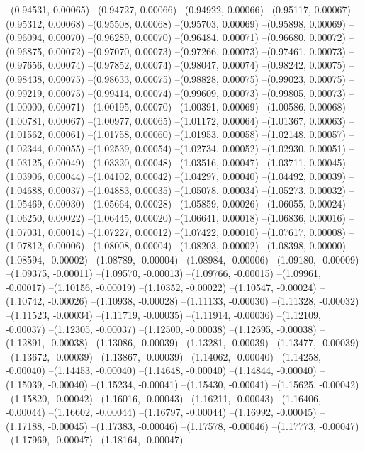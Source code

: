 --(0.94531, 0.00065)
--(0.94727, 0.00066)
--(0.94922, 0.00066)
--(0.95117, 0.00067)
--(0.95312, 0.00068)
--(0.95508, 0.00068)
--(0.95703, 0.00069)
--(0.95898, 0.00069)
--(0.96094, 0.00070)
--(0.96289, 0.00070)
--(0.96484, 0.00071)
--(0.96680, 0.00072)
--(0.96875, 0.00072)
--(0.97070, 0.00073)
--(0.97266, 0.00073)
--(0.97461, 0.00073)
--(0.97656, 0.00074)
--(0.97852, 0.00074)
--(0.98047, 0.00074)
--(0.98242, 0.00075)
--(0.98438, 0.00075)
--(0.98633, 0.00075)
--(0.98828, 0.00075)
--(0.99023, 0.00075)
--(0.99219, 0.00075)
--(0.99414, 0.00074)
--(0.99609, 0.00073)
--(0.99805, 0.00073)
--(1.00000, 0.00071)
--(1.00195, 0.00070)
--(1.00391, 0.00069)
--(1.00586, 0.00068)
--(1.00781, 0.00067)
--(1.00977, 0.00065)
--(1.01172, 0.00064)
--(1.01367, 0.00063)
--(1.01562, 0.00061)
--(1.01758, 0.00060)
--(1.01953, 0.00058)
--(1.02148, 0.00057)
--(1.02344, 0.00055)
--(1.02539, 0.00054)
--(1.02734, 0.00052)
--(1.02930, 0.00051)
--(1.03125, 0.00049)
--(1.03320, 0.00048)
--(1.03516, 0.00047)
--(1.03711, 0.00045)
--(1.03906, 0.00044)
--(1.04102, 0.00042)
--(1.04297, 0.00040)
--(1.04492, 0.00039)
--(1.04688, 0.00037)
--(1.04883, 0.00035)
--(1.05078, 0.00034)
--(1.05273, 0.00032)
--(1.05469, 0.00030)
--(1.05664, 0.00028)
--(1.05859, 0.00026)
--(1.06055, 0.00024)
--(1.06250, 0.00022)
--(1.06445, 0.00020)
--(1.06641, 0.00018)
--(1.06836, 0.00016)
--(1.07031, 0.00014)
--(1.07227, 0.00012)
--(1.07422, 0.00010)
--(1.07617, 0.00008)
--(1.07812, 0.00006)
--(1.08008, 0.00004)
--(1.08203, 0.00002)
--(1.08398, 0.00000)
--(1.08594, -0.00002)
--(1.08789, -0.00004)
--(1.08984, -0.00006)
--(1.09180, -0.00009)
--(1.09375, -0.00011)
--(1.09570, -0.00013)
--(1.09766, -0.00015)
--(1.09961, -0.00017)
--(1.10156, -0.00019)
--(1.10352, -0.00022)
--(1.10547, -0.00024)
--(1.10742, -0.00026)
--(1.10938, -0.00028)
--(1.11133, -0.00030)
--(1.11328, -0.00032)
--(1.11523, -0.00034)
--(1.11719, -0.00035)
--(1.11914, -0.00036)
--(1.12109, -0.00037)
--(1.12305, -0.00037)
--(1.12500, -0.00038)
--(1.12695, -0.00038)
--(1.12891, -0.00038)
--(1.13086, -0.00039)
--(1.13281, -0.00039)
--(1.13477, -0.00039)
--(1.13672, -0.00039)
--(1.13867, -0.00039)
--(1.14062, -0.00040)
--(1.14258, -0.00040)
--(1.14453, -0.00040)
--(1.14648, -0.00040)
--(1.14844, -0.00040)
--(1.15039, -0.00040)
--(1.15234, -0.00041)
--(1.15430, -0.00041)
--(1.15625, -0.00042)
--(1.15820, -0.00042)
--(1.16016, -0.00043)
--(1.16211, -0.00043)
--(1.16406, -0.00044)
--(1.16602, -0.00044)
--(1.16797, -0.00044)
--(1.16992, -0.00045)
--(1.17188, -0.00045)
--(1.17383, -0.00046)
--(1.17578, -0.00046)
--(1.17773, -0.00047)
--(1.17969, -0.00047)
--(1.18164, -0.00047)
